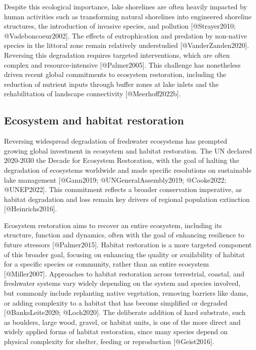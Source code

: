 \documentclass[
  letterpaper,
  DIV=11,
  numbers=noendperiod]{scrartcl}
\newcounter{none} %
\begin{document}
Despite this ecological importance, lake shorelines are often heavily
impacted by human activities such as transforming natural shorelines
into engineered shoreline structures, the introduction of invasive
species, and pollution {[}@Strayer2010; @Vadeboncoeur2002{]}. The
effects of eutrophication and predation by non-native species in the
littoral zone remain relatively understudied {[}@VanderZanden2020{]}.
Reversing this degradation requires targeted interventions, which are
often complex and resource-intensive {[}@Palmer2005{]}. This challenge
has nonetheless driven recent global commitments to ecosystem
restoration, including the reduction of nutrient inputs through buffer
zones at lake inlets and the rehabilitation of landscape connectivity
{[}@Meerhoff2022b{]}.

\subsection{Ecosystem and habitat
restoration}\label{ecosystem-and-habitat-restoration}

Reversing widespread degradation of freshwater ecosystems has prompted
growing global investment in ecosystem and habitat restoration. The UN
declared 2020-2030 the Decade for Ecosystem Restoration, with the goal
of halting the degradation of ecosystems worldwide and made specific
resolutions on sustainable lake management {[}@Gann2019;
@UNGeneralAssembly2019; @Cooke2022; @UNEP2022{]}. This commitment
reflects a broader conservation imperative, as habitat degradation and
loss remain key drivers of regional population extinction
{[}@Heinrichs2016{]}.

Ecosystem restoration aims to recover an entire ecosystem, including its
structure, function and dynamics, often with the goal of enhancing
resilience to future stressors {[}@Palmer2015{]}. Habitat restoration is
a more targeted component of this broader goal, focusing on enhancing
the quality or availability of habitat for a specific species or
community, rather than an entire ecosystem {[}@Miller2007{]}. Approaches
to habitat restoration across terrestrial, coastal, and freshwater
systems vary widely depending on the system and species involved, but
commonly include replanting native vegetation, removing barriers like
dams, or adding complexity to a habitat that has become simplified or
degraded {[}@BanksLeite2020; @Loch2020{]}. The deliberate addition of
hard substrate, such as boulders, large wood, gravel, or habitat units,
is one of the more direct and widely applied forms of habitat
restoration, since many species depend on physical complexity for
shelter, feeding or reproduction {[}@Geist2016{]}.
\end{document}
